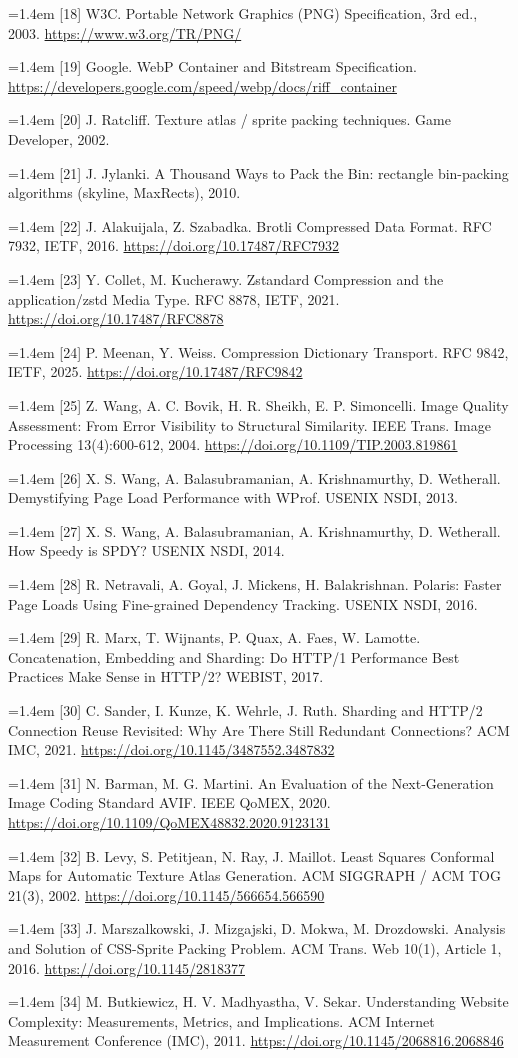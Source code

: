 \documentclass[3p,twocolumn]{elsarticle}
\newcommand{\reference}[1]{\par\noindent\hangindent=1.4em\hangafter=1 #1\par\vspace{2pt}}
\begin{document}
{\reference{[18] W3C. Portable Network Graphics (PNG) Specification, 3rd ed., 2003. \url{https://www.w3.org/TR/PNG/}}
\reference{[19] Google. WebP Container and Bitstream Specification. \url{https://developers.google.com/speed/webp/docs/riff_container}}
\reference{[20] J. Ratcliff. Texture atlas / sprite packing techniques. Game Developer, 2002.}
\reference{[21] J. Jylanki. A Thousand Ways to Pack the Bin: rectangle bin-packing algorithms (skyline, MaxRects), 2010.}
\reference{[22] J. Alakuijala, Z. Szabadka. Brotli Compressed Data Format. RFC 7932, IETF, 2016. \url{https://doi.org/10.17487/RFC7932}}
\reference{[23] Y. Collet, M. Kucherawy. Zstandard Compression and the application/zstd Media Type. RFC 8878, IETF, 2021. \url{https://doi.org/10.17487/RFC8878}}
\reference{[24] P. Meenan, Y. Weiss. Compression Dictionary Transport. RFC 9842, IETF, 2025. \url{https://doi.org/10.17487/RFC9842}}
\reference{[25] Z. Wang, A. C. Bovik, H. R. Sheikh, E. P. Simoncelli. Image Quality Assessment: From Error Visibility to Structural Similarity. IEEE Trans. Image Processing 13(4):600-612, 2004. \url{https://doi.org/10.1109/TIP.2003.819861}}
\reference{[26] X. S. Wang, A. Balasubramanian, A. Krishnamurthy, D. Wetherall. Demystifying Page Load Performance with WProf. USENIX NSDI, 2013.}
\reference{[27] X. S. Wang, A. Balasubramanian, A. Krishnamurthy, D. Wetherall. How Speedy is SPDY? USENIX NSDI, 2014.}
\reference{[28] R. Netravali, A. Goyal, J. Mickens, H. Balakrishnan. Polaris: Faster Page Loads Using Fine-grained Dependency Tracking. USENIX NSDI, 2016.}
\reference{[29] R. Marx, T. Wijnants, P. Quax, A. Faes, W. Lamotte. Concatenation, Embedding and Sharding: Do HTTP/1 Performance Best Practices Make Sense in HTTP/2? WEBIST, 2017.}
\reference{[30] C. Sander, I. Kunze, K. Wehrle, J. Ruth. Sharding and HTTP/2 Connection Reuse Revisited: Why Are There Still Redundant Connections? ACM IMC, 2021. \url{https://doi.org/10.1145/3487552.3487832}}
\reference{[31] N. Barman, M. G. Martini. An Evaluation of the Next-Generation Image Coding Standard AVIF. IEEE QoMEX, 2020. \url{https://doi.org/10.1109/QoMEX48832.2020.9123131}}
\reference{[32] B. Levy, S. Petitjean, N. Ray, J. Maillot. Least Squares Conformal Maps for Automatic Texture Atlas Generation. ACM SIGGRAPH / ACM TOG 21(3), 2002. \url{https://doi.org/10.1145/566654.566590}}
\reference{[33] J. Marszalkowski, J. Mizgajski, D. Mokwa, M. Drozdowski. Analysis and Solution of CSS-Sprite Packing Problem. ACM Trans. Web 10(1), Article 1, 2016. \url{https://doi.org/10.1145/2818377}}
\reference{[34] M. Butkiewicz, H. V. Madhyastha, V. Sekar. Understanding Website Complexity: Measurements, Metrics, and Implications. ACM Internet Measurement Conference (IMC), 2011. \url{https://doi.org/10.1145/2068816.2068846}}
}
\end{document}
